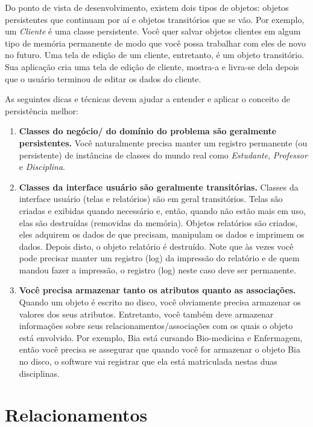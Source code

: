 \documentclass[
	11pt,				%
	openright,
	twoside,			%
	a4paper,			%
	english,			%
	french,
	brazil,				%
	sumario=tradicional
	]{abntex2}
\begin{document}
Do ponto de vista de desenvolvimento, existem dois tipos de objetos: objetos persistentes que continuam por aí e objetos transitórios que se vão. Por exemplo, um \emph{Cliente} é uma classe persistente. Você quer salvar objetos clientes em algum tipo de memória permanente de modo que você possa trabalhar com eles de novo no futuro. Uma tela de edição de um cliente, entretanto, é um objeto transitório. Sua aplicação cria uma tela de edição de cliente, mostra-a e livra-se dela depois que o usuário terminou de editar os dados do cliente.

As seguintes dicas e técnicas devem ajudar a entender e aplicar o conceito de persistência melhor:

\begin{enumerate}
\item \textbf{Classes do negócio/ do domínio do problema são geralmente persistentes.} Você  naturalmente precisa manter um registro permanente (ou persistente) de instâncias de classes do mundo real como \emph{Estudante}, \emph{Professor} e \emph{Disciplina}.

\item \textbf{Classes da interface usuário são geralmente transitórias.} Classes da interface usuário (telas e relatórios) são em geral transitórios. Telas são criadas e exibidas quando necessário e, então, quando não estão mais em uso, elas são destruídas (removidas da memória). Objetos relatórios são criados, eles adquirem os dados de que precisam, manipulam os dados e imprimem os dados. Depois disto, o objeto relatório é destruído. Note que às vezes você pode precisar manter um registro (log) da impressão do relatório e de quem mandou fazer a impressão, o registro (log) neste caso deve ser permanente.

\item \textbf{Você precisa armazenar tanto os atributos quanto as associações.}
Quando um objeto é escrito no disco, você obviamente precisa armazenar os valores dos seus atributos. Entretanto, você também deve armazenar informações sobre seus relacionamentos/associações com os quais o objeto está envolvido. Por exemplo, Bia está cursando Bio-medicina e Enfermagem, então você precisa se assegurar que quando você for armazenar o objeto Bia no disco, o software vai registrar que ela está matriculada nestas duas disciplinas.
\end{enumerate}

\section{Relacionamentos}
\end{document}
